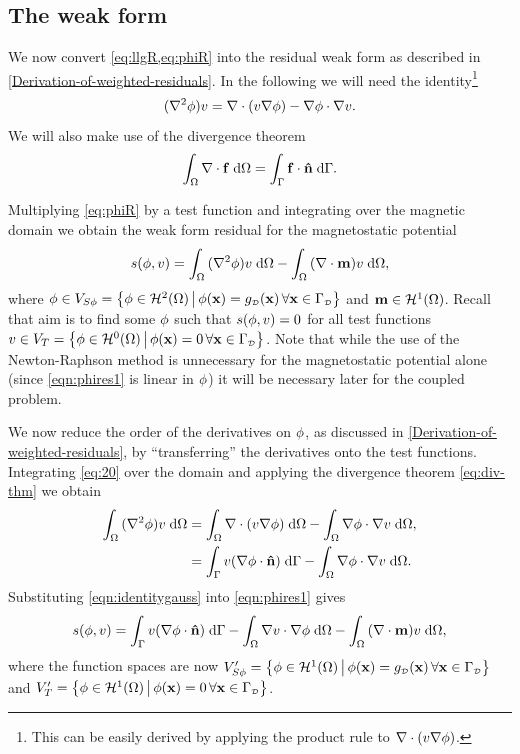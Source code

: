 \subsection{The weak form}
\label{sec:weak-form-residuals}

We now convert \cref{eq:llgR,eq:phiR} into the residual weak form as described in \cref{Derivation-of-weighted-residuals}.
In the following we will need the identity\footnote{This can be easily derived by applying the product rule to $\nabla \cdot (v \nabla \phi)$.}
\begin{equation}
  (\nabla^2 \phi) v = \nabla \cdot (v \nabla \phi) - \nabla \phi \cdot \nabla v.
  \label{eq:20}
\end{equation}
We will also make use of the divergence theorem
\begin{equation}
  {\int_{\Omega} {\nabla \cdot{\boldsymbol{\mathrm{f}}}} {\; \mathrm{{d}}}{\Omega}} = {\int_{{\Gamma}} {{\boldsymbol{\mathrm{f}}} \cdot \boldsymbol{\mathrm{\hat{n}}}} {\; \mathrm{{d}}} {{\Gamma}}}.
  \label{eq:div-thm}
\end{equation}

Multiplying \cref{eq:phiR} by a test function and integrating over the magnetic domain we obtain the weak form residual for the magnetostatic potential
\begin{gather}
  s(\phi, v) = {\int_{\Omega} { (\nabla^2 \phi) v } {\; \mathrm{{d}}} {\Omega}}
  - {\int_{\Omega} { (\nabla \cdot \boldsymbol{\mathrm{m}}) v} {\; \mathrm{{d}}} {\Omega}}, \label{eqn:phires1}
\end{gather}
where $\phi \in V_{S\phi} = \left\{ {\phi \in \mathcal{H}^2(\Omega)} \,\middle|\, {\phi(\boldsymbol{\mathrm{x}}) = g_{\scriptscriptstyle{\mathcal{D}}}(\boldsymbol{\mathrm{x}}) \,\forall \boldsymbol{\mathrm{x}} \in {\Gamma}_{\scriptscriptstyle{\mathcal{D}}} } \right\}$ and $\boldsymbol{\mathrm{m}} \in \mathcal{H}^1(\Omega)$.
Recall that aim is to find some $\phi$ such that $s(\phi, v) = 0$ for all test functions $v \in V_T = \left\{ {\phi \in \mathcal{H}^0(\Omega)} \,\middle|\, {\phi(\boldsymbol{\mathrm{x}}) = 0 \,\forall \boldsymbol{\mathrm{x}} \in {\Gamma}_{\scriptscriptstyle{\mathcal{D}}} } \right\}$.
Note that while the use of the Newton-Raphson method is unnecessary for the magnetostatic potential alone (since \cref{eqn:phires1} is linear in $\phi$) it will be necessary later for the coupled problem.

We now reduce the order of the derivatives on $\phi$, as discussed in \cref{Derivation-of-weighted-residuals}, by ``transferring'' the derivatives onto the test functions.
Integrating \cref{eq:20} over the domain and applying the divergence theorem \cref{eq:div-thm} we obtain
\begin{equation}
  \begin{aligned}
    {\int_{\Omega} { (\nabla^2\phi) v} {\; \mathrm{{d}}}{\Omega}} &=  {\int_{\Omega} {\nabla \cdot (v \nabla \phi)} {\; \mathrm{{d}}} {\Omega}}
           - {\int_{\Omega} {\nabla \phi \cdot \nabla v} {\; \mathrm{{d}}} {\Omega}},\\
    &= {\int_{{\Gamma}} {v (\nabla \phi \cdot \boldsymbol{\mathrm{\hat{n}}})} {\; \mathrm{{d}}} {{\Gamma}}}
    - {\int_{\Omega} { \nabla \phi \cdot \nabla v} {\; \mathrm{{d}}} {\Omega}}.
    \label{eqn:identitygauss}
  \end{aligned}
\end{equation}
Substituting \cref{eqn:identitygauss} into \cref{eqn:phires1} gives
\begin{equation}
  s(\phi, v) = {\int_{{\Gamma}} { v (\nabla \phi \cdot \boldsymbol{\mathrm{\hat{n}}}) } {\; \mathrm{{d}}} {{\Gamma}}}
  - {\int_{\Omega} { \nabla v \cdot \nabla \phi } {\; \mathrm{{d}}} {\Omega}}
  - {\int_{\Omega} { (\nabla \cdot \boldsymbol{\mathrm{m}}) v } {\; \mathrm{{d}}} {\Omega}},
\end{equation}
where the function spaces are now $V'_{S\phi} = \left\{ {\phi \in \mathcal{H}^1(\Omega)} \,\middle|\, {\phi(\boldsymbol{\mathrm{x}}) = g_{\scriptscriptstyle{\mathcal{D}}}(\boldsymbol{\mathrm{x}}) \,\forall \boldsymbol{\mathrm{x}} \in {\Gamma}_{\scriptscriptstyle{\mathcal{D}}} } \right\}$ and $V'_T = \left\{ {\phi \in \mathcal{H}^1(\Omega)} \,\middle|\, {\phi(\boldsymbol{\mathrm{x}}) = 0 \,\forall \boldsymbol{\mathrm{x}} \in {\Gamma}_{\scriptscriptstyle{\mathcal{D}}} } \right\}$.

